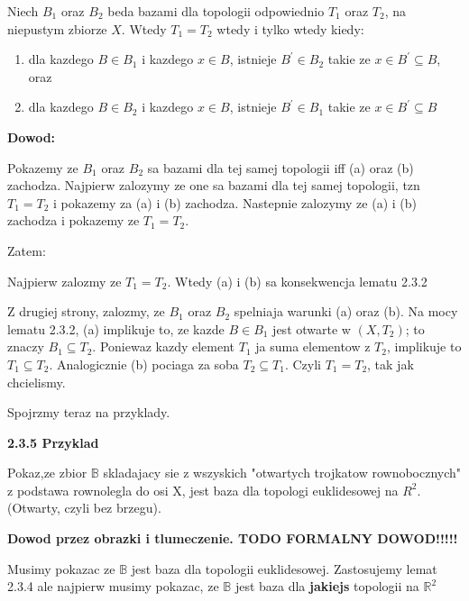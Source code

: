 \documentclass{article}
\begin{document}
\begin{tcolorbox}[colback=white!90!green,colframe=black!35!green,title=2.3.4 Lemat: Bazy dla tej samej topologii]
    Niech $B_{1}$ oraz $B_{2}$ beda bazami dla topologii odpowiednio $T_{1}$ oraz $T_{2}$, na niepustym zbiorze $X$. Wtedy $T_{1} = T_{2}$ wtedy i tylko wtedy kiedy:
    \begin{enumerate}[label=(\alph*)]
        \item dla kazdego $B \in B_{1}$ i kazdego $x \in B$, istnieje $B^{\prime} \in B_{2}$ takie ze $x \in B^{\prime} \subseteq B$, oraz
        \item dla kazdego $B \in B_{2}$ i kazdego $x \in B$, istnieje $B^{\prime} \in B_{1}$ takie ze $x \in B^{\prime} \subseteq B$
    \end{enumerate}
\end{tcolorbox}

\textbf{Dowod:}

Pokazemy ze $B_{1}$ oraz $B_{2}$ sa bazami dla tej samej topologii iff (a) oraz (b) zachodza. Najpierw zalozymy ze one sa bazami dla tej samej topologii, tzn $T_{1} = T_{2}$ i pokazemy za (a) i (b) zachodza. Nastepnie zalozymy ze (a) i (b) zachodza i pokazemy ze $T_{1} = T_{2}$.

Zatem:

Najpierw zalozmy ze $T_{1} = T_{2}$. Wtedy (a) i (b) sa konsekwencja lematu 2.3.2

Z drugiej strony, zalozmy, ze $B_{1}$ oraz $B_{2}$ spelniaja warunki (a) oraz (b). Na mocy lematu 2.3.2, (a) implikuje to, ze kazde $B \in B_{1}$ jest otwarte w $(X,T_{2})$; to znaczy $B_{1} \subseteq T_{2}$. Poniewaz kazdy element $T_{1}$ ja suma elementow z $T_{2}$, implikuje to $T_{1} \subseteq T_{2}$. Analogicznie (b) pociaga za soba $T_{2} \subseteq T_{1}$. Czyli $T_{1} = T_{2}$, tak jak chcielismy.

Spojrzmy teraz na przyklady.

\textbf{2.3.5 Przyklad}

Pokaz,ze zbior $\mathbb{B}$ skladajacy sie z wszyskich "otwartych trojkatow rownobocznych" z podstawa rownolegla do osi X, jest baza dla topologi euklidesowej na $R^{2}$.(Otwarty, czyli bez brzegu).

\textbf{Dowod przez obrazki i tlumeczenie. TODO FORMALNY DOWOD!!!!!}

Musimy pokazac ze $\mathbb{B}$ jest baza dla topologii euklidesowej. Zastosujemy lemat 2.3.4 ale najpierw musimy pokazac, ze $\mathbb{B}$ jest baza dla \textbf{jakiejs} topologii na $\mathbb{R}^{2}$ 
\end{document}
